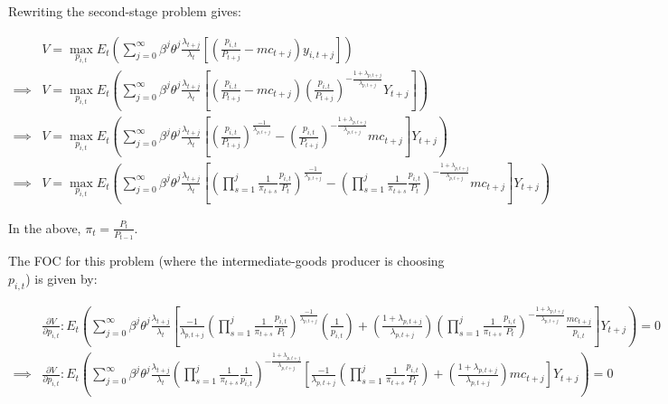 \documentclass[article,11pt,letterpaper,fleqn]{article}
\theoremstyle{definition}
\numberwithin{equation}{section}
\begin{document}
Rewriting the second-stage problem gives:

\begin{equation}
\begin{split}
 & V=\max_{p_{i,t}} E_{t}\left(\sum_{j=0}^{\infty}\beta^{j}\theta^{j}\frac{\lambda_{t+j}}{\lambda_{t}}\left[\left(\frac{p_{i,t}}{P_{t+j}}-mc_{t+j}\right)y_{i,t+j}\right]\right)
\\
\implies & V=\max_{p_{i,t}} E_{t}\left(\sum_{j=0}^{\infty} \beta^{j}\theta^{j}\frac{\lambda_{t+j}}{\lambda_{t}}\left[\left(\frac{p_{i,t}}{P_{t+j}}-mc_{t+j}\right)\left(\frac{p_{i,t}}{P_{t+j}}\right)^{-\frac{1+\lambda_{p,t+j}}{\lambda_{p,t+j}}}Y_{t+j}\right]\right) \\
 \implies & V=\max_{p_{i,t}} E_{t}\left(\sum_{j=0}^{\infty} \beta^{j}\theta^{j}\frac{\lambda_{t+j}}{\lambda_{t}}\left[\left(\frac{p_{i,t}}{P_{t+j}}\right)^{\frac{-1}{\lambda_{p,t+j}}}-\left(\frac{p_{i,t}}{P_{t+j}}\right)^{-\frac{1+\lambda_{p,t+j}}{\lambda_{p,t+j}}}mc_{t+j}\right]Y_{t+j}\right) \\
 \implies & V=\max_{p_{i,t}} E_{t}\left(\sum_{j=0}^{\infty} \beta^{j}\theta^{j}\frac{\lambda_{t+j}}{\lambda_{t}}\left[\left(\prod_{s=1}^{j}\frac{1}{\pi_{t+s}}\frac{p_{i,t}}{P_{t}}\right)^{\frac{-1}{\lambda_{p,t+j}}}-\left(\prod_{s=1}^{j}\frac{1}{\pi_{t+s}}\frac{p_{i,t}}{P_{t}}\right)^{-\frac{1+\lambda_{p,t+j}}{\lambda_{p,t+j}}}mc_{t+j}\right]Y_{t+j}\right)
\end{split}
\end{equation}

In the above, $\pi_{t}=\frac{P_{t}}{P_{t-1}}$.

The FOC for this problem (where the intermediate-goods producer is choosing $p_{i,t}$) is given by:

\begin{equation}
\begin{split}
 & \frac{\partial V}{\partial p_{i,t}}: E_{t}\left(\sum_{j=0}^{\infty} \beta^{j}\theta^{j}\frac{\lambda_{t+j}}{\lambda_{t}}\left[\frac{-1}{\lambda_{p,t+j}}\left(\prod_{s=1}^{j}\frac{1}{\pi_{t+s}}\frac{p_{i,t}}{P_{t}}\right)^{\frac{-1}{\lambda_{p,t+j}}}\left(\frac{1}{p_{i,t}}\right)+\left(\frac{1+\lambda_{p,t+j}}{\lambda_{p,t+j}}\right)\left(\prod_{s=1}^{j}\frac{1}{\pi_{t+s}}\frac{p_{i,t}}{P_{t}}\right)^{-\frac{1+\lambda_{p,t+j}}{\lambda_{p,t+j}}}\frac{mc_{t+j}}{p_{i,t}}\right]Y_{t+j}\right)=0 \\
\implies & \frac{\partial V}{\partial p_{i,t}}: E_{t}\left(\sum_{j=0}^{\infty} \beta^{j}\theta^{j}\frac{\lambda_{t+j}}{\lambda_{t}}\left(\prod_{s=1}^{j}\frac{1}{\pi_{t+s}}\frac{1}{p_{i,t}}\right)^{-\frac{1+\lambda_{p,t+j}}{\lambda_{p,t+j}}}\left[\frac{-1}{\lambda_{p,t+j}}\left(\prod_{s=1}^{j}\frac{1}{\pi_{t+s}}\frac{p_{i,t}}{P_{t}}\right)+\left(\frac{1+\lambda_{p,t+j}}{\lambda_{p,t+j}}\right)mc_{t+j}\right]Y_{t+j}\right)=0
\end{split}
\end{equation}
\end{document}
